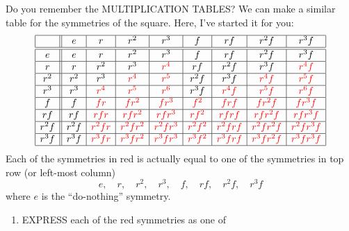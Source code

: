 \documentclass[noauthor,nooutcomes,12pt,hints,handout]{ximera}
\begin{document}
\begin{question}
\begin{freeResponse}
\begin{enumerate}
\begin{center}
      \end{center}
    \end{enumerate}
    \end{freeResponse}
\end{question}
\mynewpage


\begin{question}
  Do you remember the MULTIPLICATION TABLES? We can make a similar
  table for the symmetries of the square. Here, I've started it for
  you:
  \[
  \begin{array}{|c||c|c|c|c|c|c|c|c|}
    \hline
         & e    & r     & r^2     & r^3      & f      & rf     & r^2f      &  r^3 f\\ \hline\hline
    e    & e    & r     & r^2     & r^3      & f      & rf     & r^2f      &  r^3 f\\ \hline
    r    & r    & r^2   & r^3     & \color{red}r^4      & rf     & r^2f   & r^3f      & \color{red}r^4f\\ \hline
    r^2  & r^2  & r^3   & \color{red}r^4     & \color{red}r^5      & r^2f   & r^3f   & \color{red}r^4f      & \color{red}r^5f\\ \hline
    r^3  & r^3  & \color{red}r^4   & \color{red}r^5     & \color{red}r^6      & r^3f   & \color{red}r^4f   & \color{red}r^5f      & \color{red}r^6f\\ \hline
    f    & f    & \color{red}fr    & \color{red}fr^2    & \color{red}fr^3     & \color{red}f^2    & \color{red}frf    & \color{red}fr^2f     & \color{red}fr^3f\\ \hline
    rf   & rf   & \color{red}rfr   & \color{red}rfr^2   & \color{red}rfr^3    & \color{red}rf^2   & \color{red}rfrf   & \color{red}rfr^2f    & \color{red}rfr^3f\\ \hline
    r^2f & r^2f & \color{red}r^2fr & \color{red}r^2fr^2 & \color{red}r^2fr^3  & \color{red}r^2f^2 & \color{red}r^2frf & \color{red}r^2fr^2f  & \color{red}r^2fr^3f\\ \hline
    r^3f & r^3f & \color{red}r^3fr & \color{red}r^3fr^2 & \color{red}r^3fr^3  & \color{red}r^3f^2 & \color{red}r^3frf & \color{red}r^3f r^2f & \color{red}r^3fr^3f\\ \hline
  \end{array}
  \]
  Each of the symmetries in red is actually equal to one of the
  symmetries in top row (or left-most column)
  \[
  e,\quad r,\quad r^2,\quad r^3,\quad f,\quad rf,\quad r^2f,\quad r^3f
  \]
  where $e$ is the ``do-nothing'' symmetry.
  \begin{enumerate}
    \item EXPRESS each of the red symmetries as one of

\end{enumerate}
\end{question}
\end{document}
